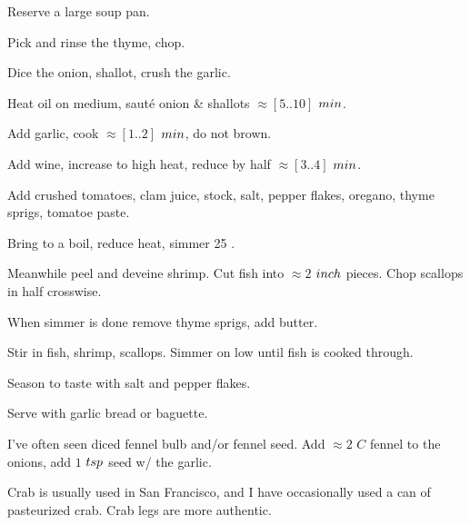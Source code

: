\begin{preparation}
\item Reserve a large soup pan.

\item Pick and rinse the thyme, chop.

\item Dice the onion, shallot, crush the garlic.

\item Heat oil on medium, saut\'{e} onion \& shallots $\approx[5..10]$ $\minute$.

\item Add garlic, cook $\approx[1..2]$ $\minute$, do not brown.

\item Add wine, increase to high heat, reduce by half $\approx[3..4]$ $\minute$.

\item Add crushed tomatoes, clam juice, stock, salt, pepper flakes, oregano, thyme sprigs, tomatoe paste.

\item Bring to a boil, reduce heat, simmer 25 \minute.

\item Meanwhile peel and deveine shrimp.
    Cut fish into $\approx2$ $\inch$ pieces.
    Chop scallops in half crosswise.

\item When simmer is done remove thyme sprigs, add butter.

\item Stir in fish, shrimp, scallops.
    Simmer on low until fish is cooked through.

\item Season to taste with salt and pepper flakes.

\item Serve with garlic bread or baguette.
\end{preparation}

\begin{variation}
\item I've often seen diced fennel bulb and/or fennel seed.
    Add $\approx2$ $C$ fennel to the onions, add $1$ $\teaspoon$ seed w/ the garlic.

\item Crab is usually used in San Francisco, and I have occasionally used a can of pasteurized crab. Crab
    legs are more authentic.

\end{variation}

\recipeend%
